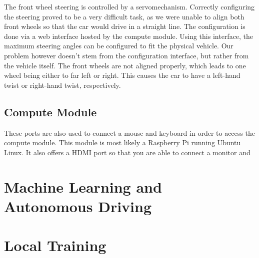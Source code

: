 The front wheel steering is controlled by a servomechanism. Correctly configuring the steering proved to be a very difficult task, as we were unable to align both front wheels so that the car would drive in a straight line. The configuration is done via a web interface hosted by the compute module. Using this interface, the maximum steering angles can be configured to fit the physical vehicle. Our problem however doesn't stem from the configuration interface, but rather from the vehicle itself. The front wheels are not aligned properly, which leads to one wheel being either to far left or right. This causes the car to have a left-hand twist or right-hand twist, respectively.

\subsection{Compute Module}
These ports are also used to connect a mouse and keyboard in order to access the compute module. This module is most likely a Raspberry Pi running Ubuntu Linux. It also offers a HDMI port so that you are able to connect a monitor and

\section{Machine Learning and Autonomous Driving}


 \section{Local Training}
 

